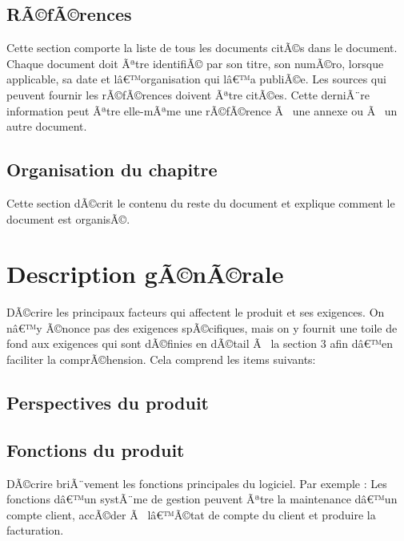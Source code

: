 \documentclass[a4paper, french, 10pt]{report}
\begin{document}
	\subsection{RÃ©fÃ©rences}
Cette section comporte la liste de tous les documents citÃ©s dans le document. Chaque document doit Ãªtre identifiÃ© par son titre, son numÃ©ro, lorsque applicable, sa date et lâ€™organisation qui lâ€™a publiÃ©e. Les sources qui peuvent fournir les rÃ©fÃ©rences doivent Ãªtre citÃ©es. Cette derniÃ¨re information peut Ãªtre elle-mÃªme une rÃ©fÃ©rence Ã  une annexe ou Ã  un autre document.

	\subsection{Organisation du chapitre}
Cette section dÃ©crit le contenu du reste du document  et explique comment le document est organisÃ©.

\section{Description gÃ©nÃ©rale}
DÃ©crire les principaux facteurs qui affectent le produit et ses exigences. On nâ€™y Ã©nonce pas des exigences spÃ©cifiques, mais on y fournit une toile de fond aux exigences qui sont dÃ©finies en dÃ©tail Ã  la section 3 afin dâ€™en faciliter la comprÃ©hension. Cela comprend les items suivants:

	\subsection{Perspectives du produit}

	\subsection{Fonctions du produit}
DÃ©crire briÃ¨vement les fonctions principales du logiciel. Par exemple : 
Les fonctions dâ€™un systÃ¨me de gestion peuvent Ãªtre la maintenance dâ€™un compte client, accÃ©der Ã  lâ€™Ã©tat de compte du client et produire la facturation.
\end{document}
